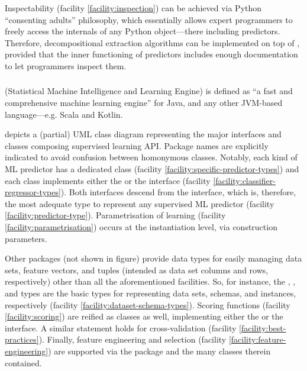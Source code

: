 \documentclass[12pt,a4paper,openright,twoside]{book}
\begin{document}
Inspectability (facility \cref{facility:inspection}) can be achieved via Python ``consenting adults'' philosophy, which essentially allows expert programmers to freely access the internals of any Python object---there including \scikit{} predictors.
%
Therefore, decompositional extraction algorithms can be implemented on top of \scikit{}, provided that the inner functioning of predictors includes enough documentation to let programmers inspect them.

\subsubsection{\smile{}}

\smile{} (Statistical Machine Intelligence and Learning Engine) \cite{SmileHomepage} is defined as ``a fast and comprehensive machine learning engine'' for Java, and any other JVM-based language---e.g. Scala and Kotlin.

 depicts a (partial) UML class diagram representing the major interfaces and classes composing \smile{} supervised learning API.
%
Package names are explicitly indicated to avoid confusion between homonymous classes.
%
Notably, each kind of ML predictor has a dedicated class (facility \ref{facility:specific-predictor-types}) and each class implements either the  or the  interface (facility \ref{facility:classifier-regressor-types}).
%
Both interfaces descend from the  interface, which is, therefore, the most adequate type to represent any supervised ML predictor (facility \ref{facility:predictor-type}).
%
Parametrisation of learning (facility \ref{facility:parametrisation}) occurs at the instantiation level, via construction parameters.

Other packages (not shown in figure) provide data types for easily managing data sets, feature vectors, and tuples (intended as data set columns and rows, respectively) other than all the aforementioned facilities.
%
So, for instance, the , , and  types are the basic types for representing data sets, schemas, and instances, respectively (facility \ref{facility:dataset-schema-types}).
%
Scoring functions (facility \ref{facility:scoring}) are reified as classes as well, implementing either the  or the  interface.
%
A similar statement holds for cross-validation (facility \ref{facility:best-practices}).
%
Finally, feature engineering and selection (facility \ref{facility:feature-engineering}) are supported via the  package and the many classes therein contained.
\end{document}
